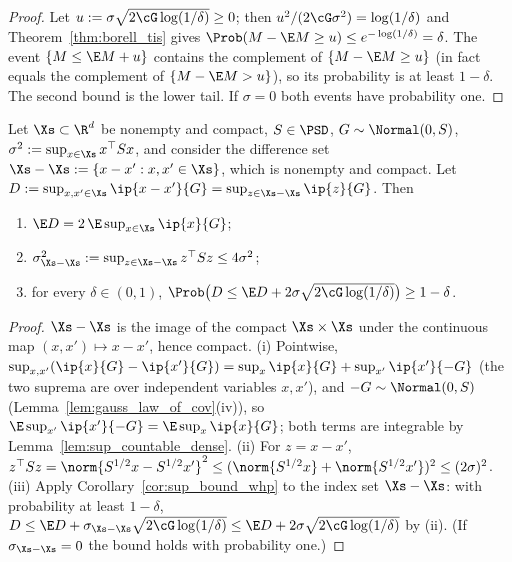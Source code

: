 \begin{proof}
Let $u := \sigma\sqrt{2\cG\log(1/\delta)} \ge 0$; then $u^2/(2\cG\sigma^2) = \log(1/\delta)$
and Theorem~\ref{thm:borell_tis} gives $\Prob(M - \E M \ge u) \le e^{-\log(1/\delta)} = \delta$.
The event $\{M \le \E M + u\}$ contains the complement of $\{M - \E M \ge u\}$ (in fact
equals the complement of $\{M - \E M > u\}$), so its probability is at least $1 - \delta$. The
second bound is the lower tail. If $\sigma = 0$ both events have probability one.
\end{proof}

\begin{corollary}\label{cor:sup_bound_symmetric}
\leanok
{}
Let $\Xs \subset \R^d$ be nonempty and compact, $S \in \PSD$, $G \sim \Normal(0,S)$,
$\sigma^2 := \sup_{x\in\Xs}x^\top Sx$, and consider the difference set
$\Xs - \Xs := \{x - x' : x, x' \in \Xs\}$, which is nonempty and compact. Let
$D := \sup_{x,x'\in\Xs}\ip{x - x'}{G} = \sup_{z\in\Xs-\Xs}\ip{z}{G}$. Then
\begin{enumerate}
  \item[(i)] $\E D = 2\,\E\sup_{x\in\Xs}\ip{x}{G}$;
  \item[(ii)] $\sigma^2_{\Xs-\Xs} := \sup_{z\in\Xs-\Xs}z^\top Sz \le 4\sigma^2$;
  \item[(iii)] for every $\delta\in(0,1)$,
        $\Prob\big(D \le \E D + 2\sigma\sqrt{2\cG\log(1/\delta)}\big) \ge 1 - \delta$.
\end{enumerate}
\end{corollary}

\begin{proof}
\leanok
{}
$\Xs - \Xs$ is the image of the compact $\Xs\times\Xs$ under the continuous map
$(x,x')\mapsto x - x'$, hence compact. (i) Pointwise,
$\sup_{x,x'}(\ip{x}{G} - \ip{x'}{G}) = \sup_x\ip{x}{G} + \sup_{x'}\ip{x'}{-G}$ (the two suprema
are over independent variables $x, x'$), and $-G \sim \Normal(0,S)$
(Lemma~\ref{lem:gauss_law_of_cov}(iv)), so $\E\sup_{x'}\ip{x'}{-G} = \E\sup_x\ip{x}{G}$; both
terms are integrable by Lemma~\ref{lem:sup_countable_dense}. (ii) For $z = x - x'$,
$z^\top Sz = \norm{S^{1/2}x - S^{1/2}x'}^2 \le (\norm{S^{1/2}x} + \norm{S^{1/2}x'})^2 \le (2\sigma)^2$.
(iii) Apply Corollary~\ref{cor:sup_bound_whp} to the index set $\Xs - \Xs$: with probability
at least $1 - \delta$, $D \le \E D + \sigma_{\Xs-\Xs}\sqrt{2\cG\log(1/\delta)} \le
\E D + 2\sigma\sqrt{2\cG\log(1/\delta)}$ by (ii). (If $\sigma_{\Xs - \Xs} = 0$ the bound holds
with probability one.)
\end{proof}

